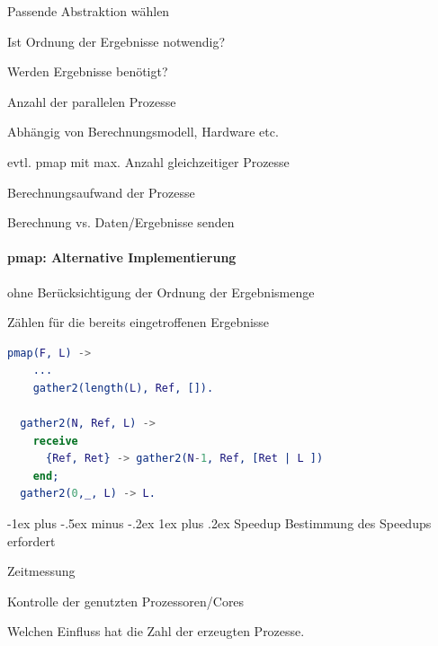 \documentclass[10pt]{article}
\makeatletter
\renewcommand{\subsubsection}{\@startsection{subsubsection}{3}{0mm}%
                                {-1ex plus -.5ex minus -.2ex}%
                                {1ex plus .2ex}%
                                {\normalfont\small\bfseries}}
\makeatother
\begin{document}
\begin{itemize*}
  \item Passende Abstraktion wählen
  \begin{itemize*}
    \item Ist Ordnung der Ergebnisse notwendig?
    \item Werden Ergebnisse benötigt?
  \end{itemize*}
  \item Anzahl der parallelen Prozesse
  \begin{itemize*}
    \item Abhängig von Berechnungsmodell, Hardware etc.
    \item evtl. pmap mit max. Anzahl gleichzeitiger Prozesse
  \end{itemize*}
  \item Berechnungsaufwand der Prozesse
  \begin{itemize*}
    \item Berechnung vs. Daten/Ergebnisse senden
  \end{itemize*}
\end{itemize*}

\paragraph{pmap: Alternative Implementierung}

\begin{itemize*}
  \item ohne Berücksichtigung der Ordnung der Ergebnismenge
  \item Zählen für die bereits eingetroffenen Ergebnisse
\end{itemize*}
\begin{lstlisting}[language=erlang]
  pmap(F, L) ->
    ...
    gather2(length(L), Ref, []).
  
  gather2(N, Ref, L) ->
    receive
      {Ref, Ret} -> gather2(N-1, Ref, [Ret | L ])
    end;
  gather2(0,_, L) -> L.
\end{lstlisting}

\subsubsection{Speedup}
Bestimmung des Speedups erfordert
\begin{itemize*}
  \item Zeitmessung
  \item Kontrolle der genutzten Prozessoren/Cores
\end{itemize*}
\color{orange} Welchen Einfluss hat die Zahl der erzeugten Prozesse. \color{black}
\end{document}
